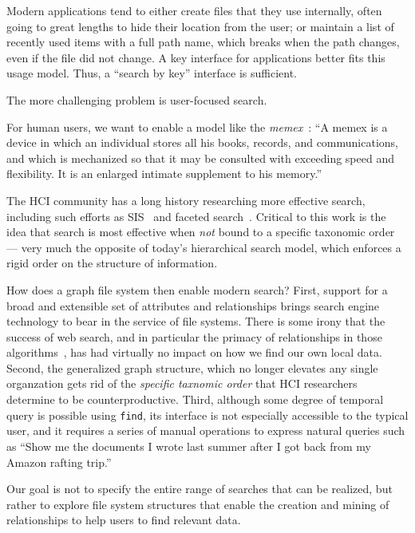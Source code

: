 Modern applications tend to either create files that they use internally, often going to great lengths
to hide their location from the user; or maintain a list of recently used items with a full path name,
which breaks when the path changes, even if the file did not change.  A key interface for applications
better fits this usage model. Thus, a ``search by key'' interface is sufficient.

The more challenging problem is user-focused search.

For human users, we want to enable a model like the
\textit{memex}~\cite{bush1945we}: ``A memex is a device in which an individual stores
all his books, records, and communications, and which is mechanized so that it may be
consulted with exceeding speed and flexibility. It is an enlarged intimate supplement
to his memory.''

The HCI community has a long history researching
more effective search, including such efforts as
SIS~\cite{dumais2016stuff} and faceted search~\cite{arenas2016faceted,tunkelang2009faceted,hearst2006design,klungre2018evaluating,walton2017looking,cleverley2015retrieving}.
Critical to this work is the idea that search is most effective
when \textit{not} bound to a specific taxonomic order --- very much the opposite of today's
hierarchical search model, which enforces a rigid
order on the structure of information.

How does a graph file system then enable modern search?
First, support for a broad and extensible set of attributes and
relationships brings search engine technology to bear in the
service of file systems.
There is some irony that the success of web search, and in particular the
primacy of relationships in those algorithms~\cite{page1999pagerank}, has had
virtually no impact on how we find our own local data.
Second, the generalized graph structure, which no longer elevates any single
organzation gets rid of the \textit{specific taxnomic order} that HCI
researchers determine to be counterproductive.
Third, although some degree of temporal query is possible using \texttt{find},
its interface is not especially accessible to the typical user, and it requires
a series of manual operations to express natural queries such as
``Show me the documents I wrote last summer after I got back from my Amazon
rafting trip.''

Our goal is not to specify the entire range of searches that can be realized, but rather to
explore file system structures that enable the creation and mining of relationships to help users to find relevant data.

